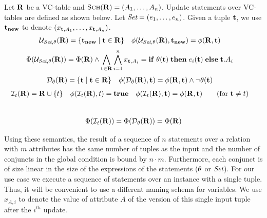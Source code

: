 \begin{defi}
  Let $\mathbf{R}$ be a VC-table and $\textsc{Sch}(\mathbf{R}) = (A_1, \ldots, A_n)$. Update statements over VC-tables are defined as shown below. %
Let  $\textit{Set} = (e_1, \ldots, e_n)$. Given a tuple $\mathbf{t}$, we use  $\mathbf{t_{new}}$ to denote $(x_{\mathbf{t},A_1}, \ldots, x_{\mathbf{t},A_n})$.
  \begin{align*}
    \mathcal{U}_{\textit{Set},\theta}(\mathbf{R})   &= \{ \mathbf{t_{new}} \mid \mathbf{t} \in \mathbf{R} \}
    &\phi(\mathcal{U}_{\textit{Set},\theta}(\mathbf{R}), \mathbf{t_{new}} )  &= \phi(\mathbf{R},\mathbf{t})
  \end{align*}
  \begin{align*}
    &\Phi(\mathcal{U}_{\textit{Set},\theta}(\mathbf{R})) = \Phi(\mathbf{R}) \land \bigwedge_{\mathbf{t} \in \mathbf{R}} \bigwedge_{i=1}^{n} x_{\mathbf{t},A_i} = \mathbf{if}\thickspace \theta(\mathbf{t}) \thickspace \mathbf{then} \thickspace e_i(\mathbf{t}) \thickspace \mathbf{else} \thickspace \mathbf{t}.A_i
    \end{align*}
  \begin{align*}
    \mathcal{D}_{\theta}(\mathbf{R})                & = \{ \mathbf{t} \mid \mathbf{t} \in \mathbf{R} \}                                                                                                                                 &
    \phi(\mathcal{D}_{\theta}(\mathbf{R}), \mathbf{t}) &= \phi(\mathbf{R}, \mathbf{t}) \land \neg \theta(\mathbf{t})
  \end{align*}
  \begin{align*}
    \ins{t}(\vcrel)                        & = \vcrel \union \{ t \}                                                                                                                                &
\lcond(\ins{t}(\vcrel),t)  &= \T
    & \lcond(\ins{t}(\vcrel),\vct) &= \lcond(\vcrel,\vct) \tag{for $\vct \neq t$}
  \end{align*}\\[-9mm]
  \begin{align*}
        \Phi(\mathcal{I}_{t}(\mathbf{R})) = \Phi(\mathcal{D}_{\theta}(\mathbf{R})) = \Phi(\mathbf{R})
  \end{align*}
\end{defi}
%
Using these semantics, the result of a sequence of $n$ statements over a relation with $m$ attributes has the same number of tuples as the input and the number of conjuncts in the global condition is bound by $n \cdot m$. Furthermore,
each conjunct is of size linear in the size of the expressions of the statements ($\theta$ or $\textit{Set}$).
 For our use case we execute a sequence of statements over an instance with a single tuple. Thus, it will be convenient to use a different naming schema for variables. We use $x_{A,i}$ to denote the value of attribute $A$ of the version of this single input tuple after the $i^{th}$ update.

